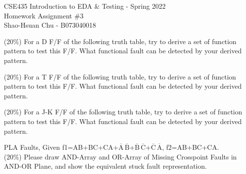 \documentclass[12pt,answers]{exam}
\begin{document}
\begin{center}
\LARGE CSE435 Introduction to EDA \& Testing - Spring 2022 \\
\Large Homework Assignment \#3 \\
\Large Shao-Hsuan Chu - B073040018 \\
\end{center}
\bigskip

\begin{questions}
  \question (20\%) For a D F/F of the following truth table, try to derive a set of function pattern to test this F/F. What functional fault can be detected by your derived pattern.
  
  \begin{solution}
  \end{solution}

  \question (20\%) For a T F/F of the following truth table, try to derive a set of function pattern to test this F/F. What functional fault can be detected by your derived pattern.
  
  \begin{solution}
  \end{solution}

  \question (20\%) For a J-K F/F of the following truth table, try to derive a set of function pattern to test this F/F. What functional fault can be detected by your derived pattern.
  
  \begin{solution}
  \end{solution}

  \question PLA Faults, Given f1=AB+BC+CA+$\overline{\text{A}}\,\overline{\text{B}}$+$\overline{\text{B}}\,\overline{\text{C}}$+$\overline{\text{C}}\,\overline{\text{A}}$, f2=AB+BC+CA. \\
(20\%) Please draw AND-Array and OR-Array of Missing Crosspoint Faults in AND-OR Plane, and show the equivalent stuck fault representation.


\end{questions}
\end{document}
